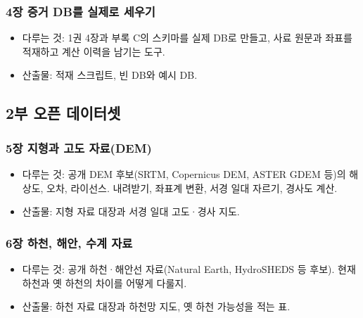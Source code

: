 \documentclass[10pt,a4paper]{article}
\providecommand{\tightlist}{\setlength{\itemsep}{0pt}\setlength{\parskip}{0pt}}
\begin{document}
\hypertarget{uxc7a5-uxc99duxac70-dbuxb97c-uxc2e4uxc81cuxb85c-uxc138uxc6b0uxae30}{%
\subsubsection{4장 증거 DB를 실제로 세우기}\label{uxc7a5-uxc99duxac70-dbuxb97c-uxc2e4uxc81cuxb85c-uxc138uxc6b0uxae30}}

\begin{itemize}
\tightlist
\item
  다루는 것: 1권 4장과 부록 C의 스키마를 실제 DB로 만들고, 사료 원문과 좌표를 적재하고 계산 이력을 남기는 도구.
\item
  산출물: 적재 스크립트, 빈 DB와 예시 DB.
\end{itemize}

\hypertarget{uxbd80-uxc624uxd508-uxb370uxc774uxd130uxc14b}{%
\subsection{2부 오픈 데이터셋}\label{uxbd80-uxc624uxd508-uxb370uxc774uxd130uxc14b}}

\hypertarget{uxc7a5-uxc9c0uxd615uxacfc-uxace0uxb3c4-uxc790uxb8ccdem}{%
\subsubsection{5장 지형과 고도 자료(DEM)}\label{uxc7a5-uxc9c0uxd615uxacfc-uxace0uxb3c4-uxc790uxb8ccdem}}

\begin{itemize}
\tightlist
\item
  다루는 것: 공개 DEM 후보(SRTM, Copernicus DEM, ASTER GDEM 등)의 해상도, 오차, 라이선스. 내려받기, 좌표계 변환, 서경 일대 자르기, 경사도 계산.
\item
  산출물: 지형 자료 대장과 서경 일대 고도·경사 지도.
\end{itemize}

\hypertarget{uxc7a5-uxd558uxcc9c-uxd574uxc548-uxc218uxacc4-uxc790uxb8cc}{%
\subsubsection{6장 하천, 해안, 수계 자료}\label{uxc7a5-uxd558uxcc9c-uxd574uxc548-uxc218uxacc4-uxc790uxb8cc}}

\begin{itemize}
\tightlist
\item
  다루는 것: 공개 하천·해안선 자료(Natural Earth, HydroSHEDS 등 후보). 현재 하천과 옛 하천의 차이를 어떻게 다룰지.
\item
  산출물: 하천 자료 대장과 하천망 지도, 옛 하천 가능성을 적는 표.
\end{itemize}
\end{document}
